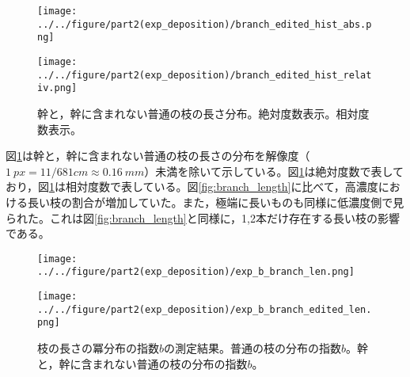 \documentclass[autodetect-engine,dvi=dvipdfmx,a4paper,ja=standard,oneside,openany,11pt]{bxjsbook}
\begin{document}
\begin{figure}[htbp]
  \begin{minipage}
    {0.45\textwidth}
    \subcaption{}
    \centering
    \texttt{[image: ../../figure/part2(exp\_deposition)/branch\_edited\_hist\_abs.png]}
    \label{fig:branch_length_absolute_edited}
  \end{minipage}
  \begin{minipage}
    {0.45\textwidth}
    \subcaption{}
    \centering
    \texttt{[image: ../../figure/part2(exp\_deposition)/branch\_edited\_hist\_relativ.png]}
    \label{fig:branch_length_relativ_edited}
  \end{minipage}
  \caption{幹と，幹に含まれない普通の枝の長さ分布。絶対度数表示。相対度数表示。}
  \label{fig:branch_length_edited}
\end{figure}

図\ref{fig:branch_length_edited}は幹と，幹に含まれない普通の枝の長さの分布を解像度（$\SI{1}{px}=11/681 \si{cm}\approx \SI{0.16}{mm}$）未満を除いて示している。図\ref{fig:branch_length_edited}は絶対度数で表しており，図\ref{fig:branch_length_edited}は相対度数で表している。図\ref{fig:branch_length}に比べて，高濃度における長い枝の割合が増加していた。また，極端に長いものも同様に低濃度側で見られた。これは図\ref{fig:branch_length}と同様に，1,2本だけ存在する長い枝の影響である。

\begin{figure}[htbp]
  \begin{minipage}
    {0.59\textwidth}
    \subcaption{}
    \centering
    \texttt{[image: ../../figure/part2(exp\_deposition)/exp\_b\_branch\_len.png]}
    \label{fig:exp_b_branch_len}
  \end{minipage}
  \begin{minipage}
    {0.39\textwidth}
    \subcaption{}
    \centering
    \texttt{[image: ../../figure/part2(exp\_deposition)/exp\_b\_branch\_edited\_len.png]}
    \label{fig:exp_b_branch_edited_len}
  \end{minipage}
  \caption{枝の長さの冪分布の指数$b$の測定結果。普通の枝の分布の指数$b$。幹と，幹に含まれない普通の枝の分布の指数$b$。}
  \label{fig:branch_length_exp}
\end{figure}
\end{document}
